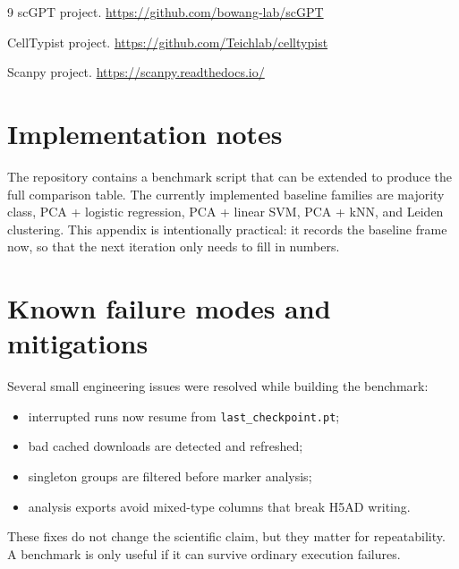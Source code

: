 \documentclass[11pt]{article}
\begin{document}
\begin{thebibliography}{9}
scGPT project.
\newblock \url{https://github.com/bowang-lab/scGPT}

CellTypist project.
\newblock \url{https://github.com/Teichlab/celltypist}

Scanpy project.
\newblock \url{https://scanpy.readthedocs.io/}
\end{thebibliography}

\appendix
\section{Implementation notes}
The repository contains a benchmark script that can be extended to produce the full comparison table.
The currently implemented baseline families are majority class, PCA + logistic regression, PCA + linear SVM, PCA + kNN, and Leiden clustering.
This appendix is intentionally practical: it records the baseline frame now, so that the next iteration only needs to fill in numbers.

\section{Known failure modes and mitigations}
Several small engineering issues were resolved while building the benchmark:
\begin{itemize}[leftmargin=1.2em]
  \item interrupted runs now resume from \texttt{last\_checkpoint.pt};
  \item bad cached downloads are detected and refreshed;
  \item singleton groups are filtered before marker analysis;
  \item analysis exports avoid mixed-type columns that break H5AD writing.
\end{itemize}

These fixes do not change the scientific claim, but they matter for repeatability.
A benchmark is only useful if it can survive ordinary execution failures.
\end{document}
